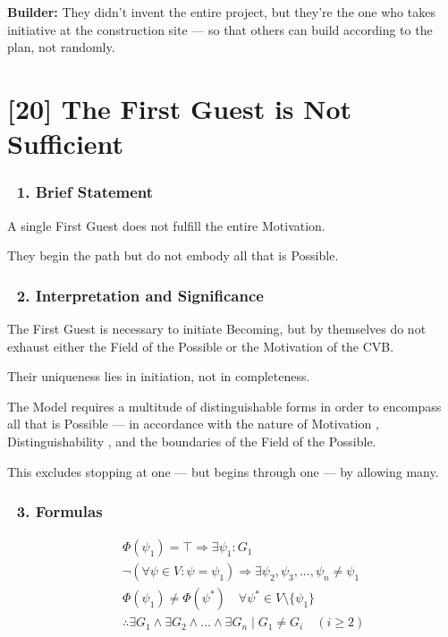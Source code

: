 \documentclass[12pt]{article}
\begin{document}
\textbf{Builder:} They didn’t invent the entire project, but they’re the one who takes initiative at the construction site — so that others can build according to the plan, not randomly.


\section*{[20] The First Guest is Not Sufficient}

\subsubsection*{🔹 1. Brief Statement}

A single First Guest does not fulfill the entire Motivation.

They begin the path but do not embody all that is Possible.

\subsubsection*{🔹 2. Interpretation and Significance}

The First Guest is necessary to initiate Becoming, but by themselves do not exhaust either the Field of the Possible or the Motivation of the CVB.

Their uniqueness lies in initiation, not in completeness.

The Model requires a multitude of distinguishable forms in order to encompass all that is Possible — in accordance with the nature of Motivation \text{[16]}, Distinguishability \text{[5]}, and the boundaries \text{[4]} of the Field of the Possible.

This excludes stopping at one — but begins through one — by allowing many.

\subsubsection*{🔹 3. Formulas}

\[
\begin{aligned}
& \quad \Phi(\psi_1) = \top \Rightarrow \exists \psi_1 : G_1 \\
& \quad \neg(\forall \psi \in V : \psi = \psi_1) \Rightarrow \exists \psi_2, \psi_3, ..., \psi_n \neq \psi_1 \\
& \quad \Phi(\psi_1) \neq \Phi(\psi^*) \quad \forall \psi^* \in V \setminus \{\psi_1\} \\
& \quad \therefore \exists G_1 \land \exists G_2 \land \dots \land \exists G_n \mid G_1 \neq G_i \quad (i \geq 2)
\end{aligned}
\]
\end{document}
